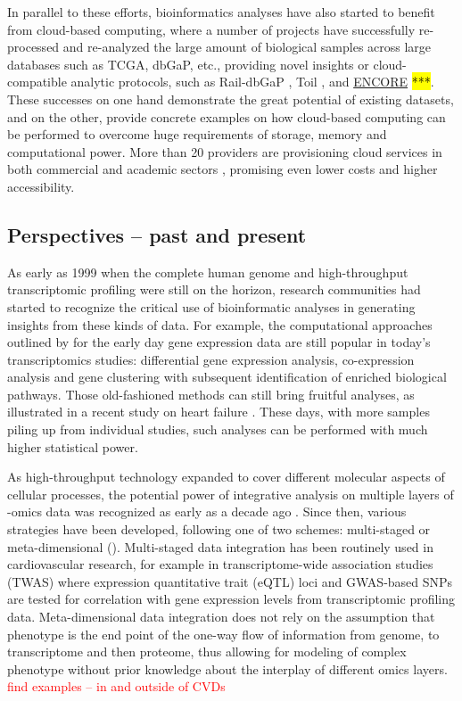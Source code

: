 \documentclass[letter]{bioinfo}
\newcommand{\comment}[1]{\textcolor{red}{#1}}
\begin{document}
	In parallel to these efforts, bioinformatics analyses have also started to benefit from cloud-based computing, where a number of projects have successfully re-processed and re-analyzed the large amount of biological samples across large databases such as TCGA, dbGaP, etc., providing novel insights or cloud-compatible analytic protocols, such as Rail-dbGaP \citep{Nellore:2016:RaildbGaP}, Toil \citep{Vivian:2017:Toil}, and \href{https://encore.sph.umich.edu/}{ENCORE} \hl{***}. These successes on one hand demonstrate the great potential of existing datasets, and on the other, provide concrete examples on how cloud-based computing can be performed to overcome huge requirements of storage, memory and computational power. More than 20 providers are provisioning cloud services in both commercial and academic sectors \citep{Langmead:2018:Cloud}, promising even lower costs and higher accessibility.
	
	
	
	\subsection*{Perspectives -- past and present}
	
	As early as 1999 when the complete human genome and high-throughput transcriptomic profiling were still on the horizon, research communities had started to recognize the critical use of bioinformatic analyses in generating insights from these kinds of data. For example, the computational approaches outlined by \cite{Claverie:1999:Computational} for the early day gene expression data are still popular in today's transcriptomics studies: differential gene expression analysis, co-expression analysis and gene clustering with subsequent identification of enriched biological pathways. Those old-fashioned methods can still bring fruitful analyses, as illustrated in a recent study on heart failure \citep{Santolini:2018:personalized}. These days, with more samples piling up from individual studies, such analyses can be performed with much higher statistical power.
	
	As high-throughput technology expanded to cover different molecular aspects of cellular processes, the potential power of integrative analysis on multiple layers of -omics data was recognized as early as a decade ago \citep{Hawkins:2010:Nextgeneration}. Since then, various strategies have been developed, following one of two schemes: multi-staged or meta-dimensional (\cite{Ritchie:2015:Methods}). Multi-staged data integration has been routinely used in cardiovascular research, for example in transcriptome-wide association studies (TWAS) where expression quantitative trait (eQTL) loci and GWAS-based SNPs are tested for correlation with gene expression levels from transcriptomic profiling data. Meta-dimensional data integration does not rely on the assumption that phenotype is the end point of the one-way flow of information from genome, to transcriptome and then proteome, thus allowing for modeling of complex phenotype without prior knowledge about the interplay of different omics layers.
	\comment{find examples -- in and outside of CVDs}
	
\end{document}
